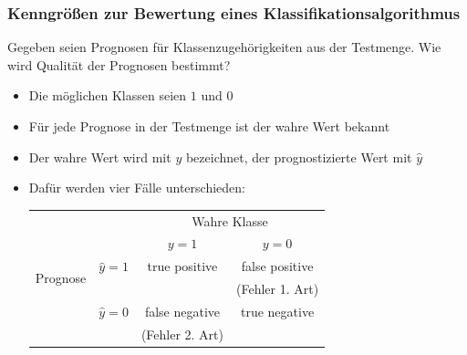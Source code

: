 \begin{frame}
\frametitle{Kenngrößen zur Bewertung eines Klassifikationsalgorithmus}
Gegeben seien Prognosen für Klassenzugehörigkeiten aus der Testmenge. Wie wird Qualität der Prognosen bestimmt?
\begin{itemize}[<+->]
\item Die möglichen Klassen seien $1$ und $0$
\pause
\item Für jede Prognose in der Testmenge ist der wahre Wert bekannt
\pause
\item Der wahre Wert wird mit $y$ bezeichnet, der prognostizierte Wert mit $\hat{y}$
\pause
\item Dafür werden vier Fälle unterschieden:\\[0.3cm]
\begin{tabular}{c|c|c|c|}
\multicolumn{2}{c}{}&  \multicolumn{2}{c}{Wahre Klasse} \\
 \cline{2-4}
& & $y=1$ & $y=0$ \\
 \cline{2-4}
\multirow{ 2}{*}{Prognose}&$\hat{y}=1$ & true positive & false positive \\  
 & & & (Fehler 1. Art)\\
  \cline{2-4}
&$\hat{y}=0$ & false negative & true negative \\  
 & & (Fehler 2. Art) & \\
  \cline{2-4}
\end{tabular}
\end{itemize}
\end{frame}
